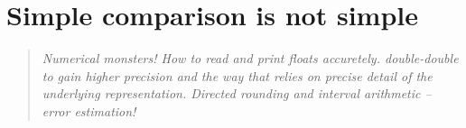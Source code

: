 \section{Simple comparison is not simple}
\begin{quotation}\textit{
Numerical monsters! How to read and print floats accuretely.
double-double to gain higher precision and the way that relies on
precise detail of the underlying representation. Directed rounding
and interval arithmetic -- error estimation!
}\end{quotation}
